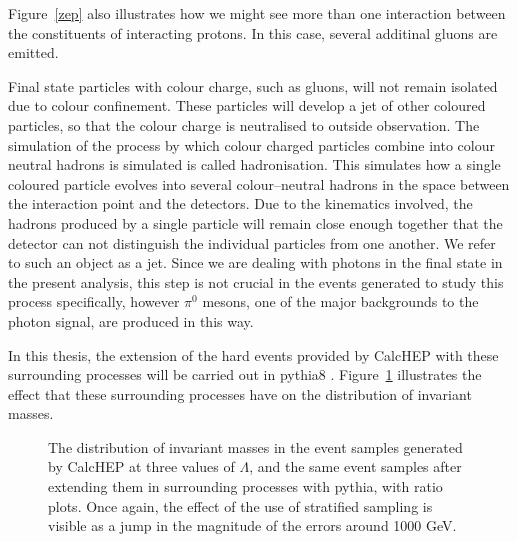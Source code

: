 Figure~\ref{zep} also illustrates how we might see more than one interaction between the constituents of interacting protons. In this case, several additinal gluons are emitted.

Final state particles with colour charge, such as gluons, will not remain isolated due to colour confinement. These particles will develop a jet of other coloured particles, so that the colour charge is neutralised to outside observation. The simulation of the process by which colour charged particles combine into colour neutral hadrons is simulated is called hadronisation. This simulates how a single coloured particle evolves into several colour--neutral hadrons in the space between the interaction point and the detectors. Due to the kinematics involved, the hadrons produced by a single particle will remain close enough together that the detector can not distinguish the individual particles from one another. We refer to such an object as a jet. Since we are dealing with photons in the final state in the present analysis, this step is not crucial in the events generated to study this process specifically, however $\pi^0$ mesons, one of the major backgrounds to the photon signal, are produced in this way. 

In this thesis, the extension of the hard events provided by CalcHEP with these surrounding processes will be carried out in pythia8 \cite{pythia}. Figure~\ref{pythify} illustrates the effect that these surrounding processes have on the distribution of invariant masses.

\begin{figure}[htp]
\centering
\begin{minipage}[b]{.69\textwidth}\hspace{-1.5em}\makebox[0pt][l]{
\noindent\begin{infilsf}
\tiny

\end{infilsf}}
\end{minipage}\hfill
\caption{The distribution of invariant masses in the event samples generated by CalcHEP at three values of $\Lambda$, and the same event samples after extending them in surrounding processes with pythia, with ratio plots. Once again, the effect of the use of stratified sampling is visible as a jump in the magnitude of the errors around 1000 GeV.
\label{pythify}}
\end{figure}

